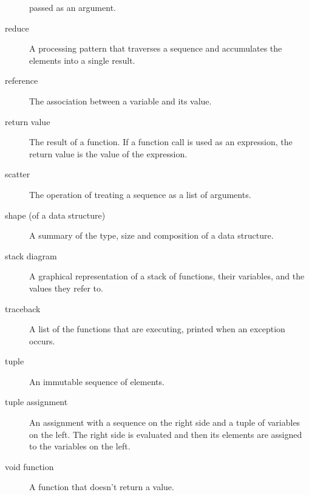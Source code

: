 \documentclass{article}
\begin{document}
\begin{description}
    passed as an argument.
\item [reduce] A processing pattern that traverses a sequence and accumulates the elements into a single result.
\item [reference] The association between a variable and its value.
\item [return value] The result of a function. If a function call is
    used as an expression, the return value is the value of the
    expression.
\item [scatter] The operation of treating a sequence as a list of
    arguments.
\item [shape (of a data structure)] A summary of the type, size and
    composition of a data structure.
\item [stack diagram] A graphical representation of a stack of
    functions, their variables, and the values they refer to.
\item [traceback] A list of the functions that are executing, printed
    when an exception occurs.
\item [tuple] An immutable sequence of elements.
\item [tuple assignment] An assignment with a sequence on the right
    side and a tuple of variables on the left. The right side is
    evaluated and then its elements are assigned to the variables on
    the left.
\item [void function] A function that doesn't return a value.
\end{description}


\newpage

\end{document}
